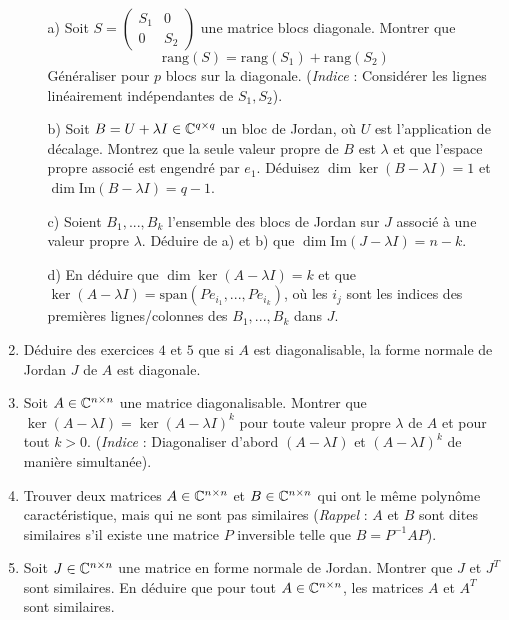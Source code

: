 \begin{enumerate}
\begin{enumerate}
\item[a)] Soit $S = \begin{pmatrix} S_1 & 0 \\ 0 & S_2 \end{pmatrix}$ une matrice blocs diagonale. Montrer que $$\text{rang}(S) = \text{rang}(S_1) + \text{rang}(S_2)$$ 
Généraliser pour $p$ blocs sur la diagonale. (\textit{Indice} : Considérer les lignes linéairement indépendantes de $S_1, S_2$).
\item[b)] Soit $B = U + \lambda I \in \Bbb C^{q \times q}$ un bloc de Jordan, où $U$ est l'application de décalage. Montrez que la seule valeur propre de $B$ est $\lambda$ et que l'espace propre associé est engendré par $e_1$. Déduisez $\dim \ker (B - \lambda I) = 1$ et $\dim \text{Im} (B - \lambda I) = q-1$.
\item[c)] Soient $B_1, ..., B_k$ l'ensemble des blocs de Jordan sur $J$ associé à une valeur propre $\lambda$. Déduire de a) et b) que $\dim \text{Im} (J - \lambda I) = n - k$.
\item[d)] En déduire que $\dim \ker (A - \lambda I) = k$ et que $\ker (A - \lambda I) = \text{span}(Pe_{i_1}, ..., Pe_{i_k})$, où les $i_j$ sont les indices des premières lignes/colonnes des $B_1, ..., B_k$ dans $J$.
\end{enumerate}

\item Déduire des exercices $4$ et $5$ que si $A$ est diagonalisable, la forme normale de Jordan $J$ de $A$ est diagonale.

\item Soit $A \in \Bbb C^{n \times n}$ une matrice diagonalisable. Montrer que $\ker(A - \lambda I) = \ker(A - \lambda I)^k$ pour toute valeur propre $\lambda$ de $A$ et pour tout $k > 0$. (\textit{Indice} : Diagonaliser d'abord $(A - \lambda I)$ et $(A - \lambda I)^k$ de manière simultanée).

\item Trouver deux matrices $A \in \Bbb C^{n \times n}$ et $B \in \Bbb C^{n \times n}$ qui ont le même polynôme caractéristique, mais qui ne sont pas similaires (\emph{Rappel} : $A$ et $B$ sont dites similaires s'il existe une matrice $P$ inversible telle que $B = P^{-1} A P$).

\item Soit $J \in \Bbb C^{n \times n}$ une matrice en forme normale de Jordan. Montrer que $J$ et $J^T$ sont similaires. En déduire que pour tout $A \in \Bbb C^{n \times n}$, les matrices $A$ et $A^T$ sont similaires.
\end{enumerate}
